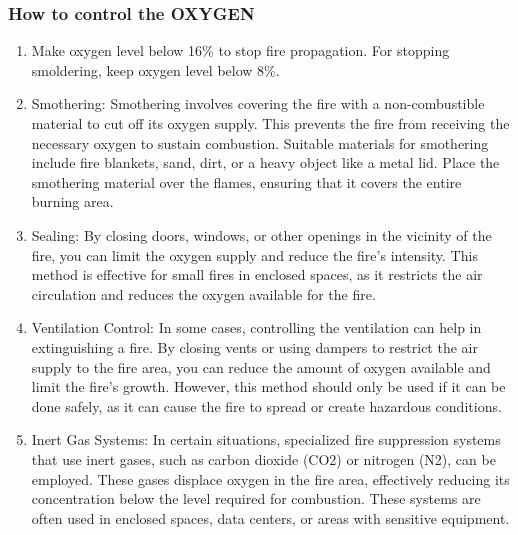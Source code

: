 \documentclass{article}
\begin{document}
\subsubsection*{How to control the OXYGEN}
\begin{enumerate}
  \item Make oxygen level below 16\% to stop fire propagation. For stopping smoldering, keep oxygen level below 8\%. 
  \item Smothering: Smothering involves covering the fire with a non-combustible material to cut off its oxygen supply. This prevents the fire from receiving the necessary oxygen to sustain combustion. Suitable materials for smothering include fire blankets, sand, dirt, or a heavy object like a metal lid. Place the smothering material over the flames, ensuring that it covers the entire burning area.  
  \item Sealing: By closing doors, windows, or other openings in the vicinity of the fire, you can limit the oxygen supply and reduce the fire's intensity. This method is effective for small fires in enclosed spaces, as it restricts the air circulation and reduces the oxygen available for the fire.
  
  \item Ventilation Control: In some cases, controlling the ventilation can help in extinguishing a fire. By closing vents or using dampers to restrict the air supply to the fire area, you can reduce the amount of oxygen available and limit the fire's growth. However, this method should only be used if it can be done safely, as it can cause the fire to spread or create hazardous conditions.
  
  \item Inert Gas Systems: In certain situations, specialized fire suppression systems that use inert gases, such as carbon dioxide (CO2) or nitrogen (N2), can be employed. These gases displace oxygen in the fire area, effectively reducing its concentration below the level required for combustion. These systems are often used in enclosed spaces, data centers, or areas with sensitive equipment.
\end{enumerate}
\end{document}
